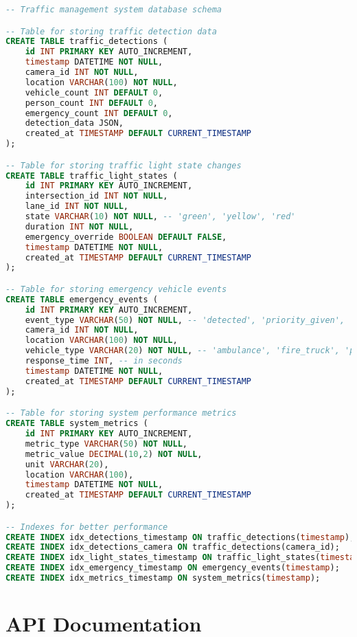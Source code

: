 \begin{lstlisting}[language=SQL, caption=Database Schema for Traffic Data]
-- Traffic management system database schema

-- Table for storing traffic detection data
CREATE TABLE traffic_detections (
    id INT PRIMARY KEY AUTO_INCREMENT,
    timestamp DATETIME NOT NULL,
    camera_id INT NOT NULL,
    location VARCHAR(100) NOT NULL,
    vehicle_count INT DEFAULT 0,
    person_count INT DEFAULT 0,
    emergency_count INT DEFAULT 0,
    detection_data JSON,
    created_at TIMESTAMP DEFAULT CURRENT_TIMESTAMP
);

-- Table for storing traffic light state changes
CREATE TABLE traffic_light_states (
    id INT PRIMARY KEY AUTO_INCREMENT,
    intersection_id INT NOT NULL,
    lane_id INT NOT NULL,
    state VARCHAR(10) NOT NULL, -- 'green', 'yellow', 'red'
    duration INT NOT NULL,
    emergency_override BOOLEAN DEFAULT FALSE,
    timestamp DATETIME NOT NULL,
    created_at TIMESTAMP DEFAULT CURRENT_TIMESTAMP
);

-- Table for storing emergency vehicle events
CREATE TABLE emergency_events (
    id INT PRIMARY KEY AUTO_INCREMENT,
    event_type VARCHAR(50) NOT NULL, -- 'detected', 'priority_given', 'cleared'
    camera_id INT NOT NULL,
    location VARCHAR(100) NOT NULL,
    vehicle_type VARCHAR(20) NOT NULL, -- 'ambulance', 'fire_truck', 'police'
    response_time INT, -- in seconds
    timestamp DATETIME NOT NULL,
    created_at TIMESTAMP DEFAULT CURRENT_TIMESTAMP
);

-- Table for storing system performance metrics
CREATE TABLE system_metrics (
    id INT PRIMARY KEY AUTO_INCREMENT,
    metric_type VARCHAR(50) NOT NULL,
    metric_value DECIMAL(10,2) NOT NULL,
    unit VARCHAR(20),
    location VARCHAR(100),
    timestamp DATETIME NOT NULL,
    created_at TIMESTAMP DEFAULT CURRENT_TIMESTAMP
);

-- Indexes for better performance
CREATE INDEX idx_detections_timestamp ON traffic_detections(timestamp);
CREATE INDEX idx_detections_camera ON traffic_detections(camera_id);
CREATE INDEX idx_light_states_timestamp ON traffic_light_states(timestamp);
CREATE INDEX idx_emergency_timestamp ON emergency_events(timestamp);
CREATE INDEX idx_metrics_timestamp ON system_metrics(timestamp);
\end{lstlisting}

\section{API Documentation}
\label{app:api_documentation}

